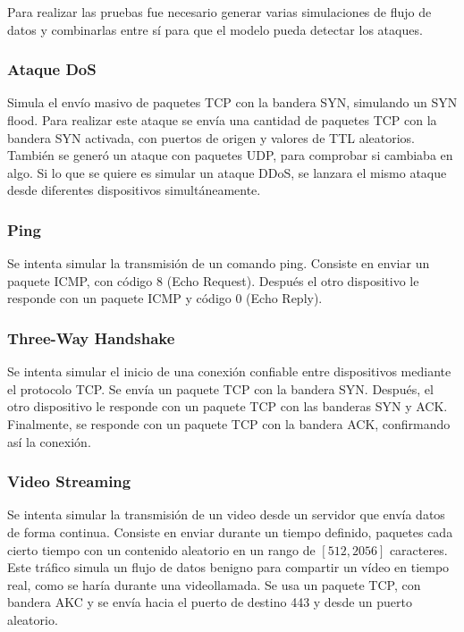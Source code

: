 
Para realizar las pruebas fue necesario generar varias simulaciones de flujo de datos y combinarlas entre sí para que el modelo pueda detectar los ataques.

\subsubsection{Ataque DoS}
\label{subsubsec:AtaqueDoSTCP}
Simula el envío masivo de paquetes TCP con la bandera SYN, simulando un SYN flood. Para realizar este ataque se envía una cantidad de paquetes TCP con la bandera SYN activada, con puertos de origen y valores de TTL aleatorios. También se generó un ataque con paquetes UDP, para comprobar si cambiaba en algo.
Si lo que se quiere es simular un ataque DDoS, se lanzara el mismo ataque desde diferentes dispositivos simultáneamente.

\subsubsection{Ping}
\label{subsubsec:Ping}
Se intenta simular la transmisión de un comando ping. Consiste en enviar un paquete ICMP, con código 8 (Echo Request). Después el otro dispositivo le responde con un paquete ICMP y código 0 (Echo Reply).

\subsubsection{Three-Way Handshake}
\label{subsubsec:ThreeWayHandshake}
Se intenta simular el inicio de una conexión confiable entre dispositivos mediante el protocolo TCP. Se envía un paquete TCP con la bandera SYN. Después, el otro dispositivo le responde con un paquete TCP con las banderas SYN y ACK. Finalmente, se responde con un paquete TCP con la bandera ACK, confirmando así la conexión.

\subsubsection{Video Streaming}
\label{subsubsec:VideoStreaming}
Se intenta simular la transmisión de un video desde un servidor que envía datos de forma continua. Consiste en enviar durante un tiempo definido, paquetes cada cierto tiempo con un contenido aleatorio en un rango de \([512, 2056]\) caracteres. Este tráfico simula un flujo de datos benigno para compartir un vídeo en tiempo real, como se haría durante una videollamada. Se usa un paquete TCP, con bandera AKC y se envía hacia el puerto de destino 443 y desde un puerto aleatorio.
